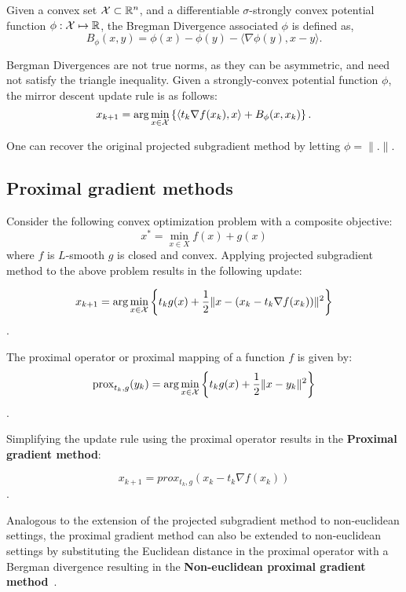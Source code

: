 \begin{definition}
	\label{def:bregman}
	Given a convex set $\mathcal{X} \subset \mathbb{R}^n$, and a differentiable $\sigma$-strongly convex potential
	function $\phi: \mathcal{X} \mapsto \mathbb{R}$, the Bregman Divergence associated $\phi$ is defined as, $$
		B_\phi(x, y) = \phi(x) - \phi(y) - \langle \nabla \phi(y), x-y \rangle.
	$$
\end{definition}

Bergman Divergences are not true norms, as they can be asymmetric, and need not satisfy the
triangle inequality.
Given a strongly-convex potential function $\phi$, the mirror descent update rule is as follows:
\begin{equation}
	x_{k+1} = \arg \min_{x \in \mathcal{X}} \left \{ \left \langle t_k \nabla f(x_k), x
	\right \rangle + B_\phi(x, x_k) \right \}.
\end{equation}

One can recover the original projected subgradient method by letting $\phi=\|.
	\|$.

\subsection{Proximal gradient methods}
Consider the following convex optimization problem with a composite objective:
\begin{equation*}
	x^{\ast} = \min_{x \in X} f(x) + g(x)
\end{equation*} where $f$ is $L$-smooth $g$ is closed and
convex.
Applying projected subgradient method to the above problem results in the following update:

$$ x_{k+1} = \arg \min_{x \in \mathcal{X}} \left\{ t_k g(x) + \frac{1}{2} \| x - (x_k
	- t_k \nabla f(x_k)) \|^2 \right\}$$.

\begin{definition} The
	proximal operator or proximal mapping of a function $f$ is given by:
	$$\text{prox}_{t_k, g}(y_k) = \arg \min_{x \in \mathcal{X}} \left\{ t_k g(x) + \frac{1}{2}\| x - y_k \|^2 \right\} $$.
\end{definition}

Simplifying the update rule using the proximal operator results in the \textbf{Proximal gradient
	method}:

$$ x_{k+1} = prox_{t_k, g}(x_k - t_k \nabla f(x_k))$$.

Analogous to the extension of the projected subgradient method to non-euclidean settings, the
proximal gradient method can also be extended to non-euclidean settings by substituting the
Euclidean distance in the proximal operator with a Bergman divergence resulting in the
\textbf{Non-euclidean proximal gradient method}~\cite{tsengApproximation2010,beckFirstOrder2017}.

